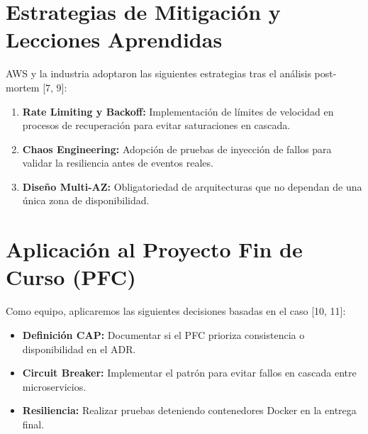 \documentclass[12pt,a4paper]{article}
\begin{document}
\section{Estrategias de Mitigación y Lecciones Aprendidas}
AWS y la industria adoptaron las siguientes estrategias tras el análisis post-mortem [7, 9]:
\begin{enumerate}
    \item \textbf{Rate Limiting y Backoff:} Implementación de límites de velocidad en procesos de recuperación para evitar saturaciones en cascada.
    \item \textbf{Chaos Engineering:} Adopción de pruebas de inyección de fallos para validar la resiliencia antes de eventos reales.
    \item \textbf{Diseño Multi-AZ:} Obligatoriedad de arquitecturas que no dependan de una única zona de disponibilidad.
\end{enumerate}

\section{Aplicación al Proyecto Fin de Curso (PFC)}
Como equipo, aplicaremos las siguientes decisiones basadas en el caso [10, 11]:
\begin{itemize}
    \item \textbf{Definición CAP:} Documentar si el PFC prioriza consistencia o disponibilidad en el ADR.
    \item \textbf{Circuit Breaker:} Implementar el patrón para evitar fallos en cascada entre microservicios.
    \item \textbf{Resiliencia:} Realizar pruebas deteniendo contenedores Docker en la entrega final.
\end{itemize}
\end{document}
